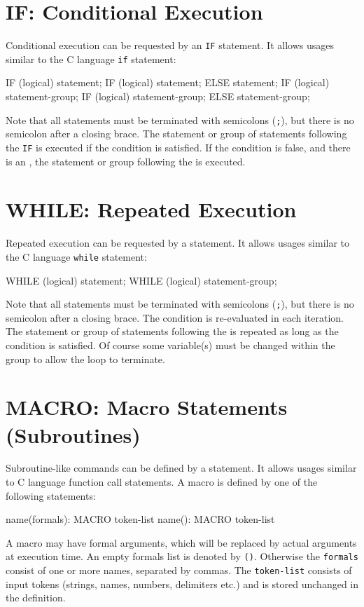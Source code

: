 \section{IF: Conditional Execution}
\label{sec:if}
Conditional execution can be requested by an \texttt{IF} statement.
It allows usages similar to the C language \texttt{if} statement:
\begin{example}
IF (logical) statement;
IF (logical) statement; ELSE statement;
IF (logical) { statement-group; }
IF (logical) { statement-group; }
  ELSE { statement-group; }
\end{example}
Note that all statements must be terminated with semicolons (\texttt{;}),
but there is no semicolon after a closing brace.
The statement or group of statements following the \texttt{IF} is
executed if the condition is satisfied.
If the condition is false, and there is an ,
the statement or group following the  is executed.

\section{WHILE: Repeated Execution}
\label{sec:while}
Repeated execution can be requested by a  statement.
It allows usages similar to the C language \texttt{while} statement:
\begin{example}
WHILE (logical) statement;
WHILE (logical) { statement-group; }
\end{example}
Note that all statements must be terminated with semicolons (\texttt{;}),
but there is no semicolon after a closing brace.
The condition is re-evaluated in each iteration.
The statement or group of statements following the  is
repeated as long as the condition is satisfied.
Of course some variable(s) must be changed within the  group
to allow the loop to terminate.

\section{MACRO: Macro Statements (Subroutines)}
\label{sec:macro}
Subroutine-like commands can be defined by a  statement.
It allows usages similar to C language function call statements.
A macro is defined by one of the following statements:
\begin{example}
name(formals): MACRO { token-list }
name(): MACRO { token-list }
\end{example}
A macro may have formal arguments, which will be replaced by actual arguments
at execution time. An empty formals list is denoted by \texttt{()}.
Otherwise the \texttt{formals} consist of one or more names,
separated by commas.
The \texttt{token-list} consists of input tokens
(strings, names, numbers, delimiters etc.)
and is stored unchanged in the definition.

